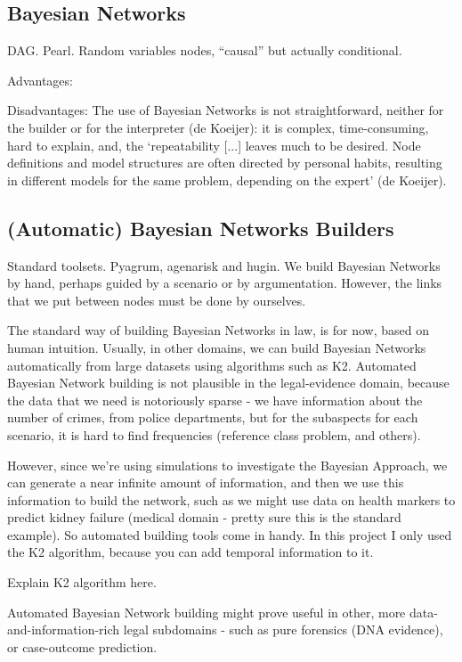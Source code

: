 \subsection{Bayesian Networks}
DAG. Pearl. Random variables nodes, ``causal'' but actually conditional.


Advantages:

Disadvantages: The use of Bayesian Networks is not straightforward, neither for the builder or for the interpreter (de Koeijer): it is complex, time-consuming, hard to explain, and, the `repeatability [...] leaves much to be desired. Node definitions and model structures are often directed by personal habits, resulting in different models for the same problem, depending on the expert' (de Koeijer).


\subsection{(Automatic) Bayesian Networks Builders}
Standard toolsets. Pyagrum, agenarisk and hugin. We build Bayesian Networks by hand, perhaps guided by a scenario or by argumentation. However, the links that we put between nodes must be done by ourselves.

The standard way of building Bayesian Networks in law, is for now, based on human intuition. Usually, in other domains, we can build Bayesian Networks automatically from large datasets using algorithms such as K2. Automated Bayesian Network building is not plausible in the legal-evidence domain, because the data that we need is notoriously sparse - we have information about the number of crimes, from police departments, but for the subaspects for each scenario, it is hard to find frequencies (reference class problem, and others).

However, since we're using simulations to investigate the Bayesian Approach, we can generate a near infinite amount of information, and then we use this information to build the network, such as we might use data on health markers to predict kidney failure (medical domain - pretty sure this is the standard example). So automated building tools come in handy. In this project I only used the K2 algorithm, because you can add temporal information to it.

{\color{red}Explain K2 algorithm here.}

Automated Bayesian Network building might prove useful in other, more data-and-information-rich legal subdomains - such as pure forensics (DNA evidence), or case-outcome prediction.


